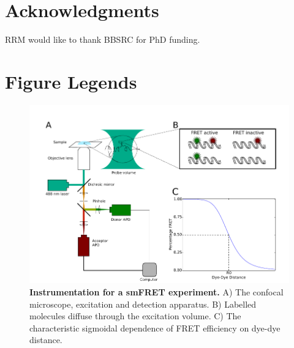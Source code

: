 \section*{Acknowledgments}
RRM would like to thank BBSRC for PhD funding.


%

\section*{Figure Legends}

\begin{figure}[!ht]
   \begin{center}
      \includegraphics*[clip=true, width=5in]{pyFRET/Fig1_schematic.pdf}
      \caption{{\bf Instrumentation for a smFRET experiment.} A) The confocal microscope, excitation and detection apparatus. B) Labelled molecules diffuse through the excitation volume. C) The characteristic sigmoidal dependence of FRET efficiency on dye-dye distance.}
      \label{fig:fig1_instrumentation}
   \end{center}
\end{figure}

